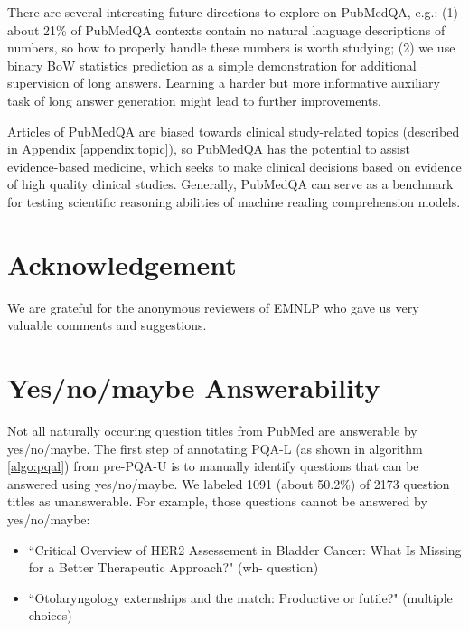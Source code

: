 \documentclass[11pt,a4paper]{article}
\begin{document}
There are several interesting future directions to explore on PubMedQA, e.g.: (1) about 21\% of PubMedQA contexts contain no natural language descriptions of numbers, so how to properly handle these numbers is worth studying; (2)  we use binary BoW statistics prediction as a simple demonstration for additional supervision of long answers. Learning a harder but more informative auxiliary task of long answer generation might lead to further improvements.

Articles of PubMedQA are biased towards clinical study-related topics (described in Appendix \ref{appendix:topic}), so PubMedQA has the potential to assist evidence-based medicine, which seeks to make clinical decisions based on evidence of high quality clinical studies. Generally, PubMedQA can serve as a benchmark for testing scientific reasoning abilities of machine reading comprehension models.

\section{Acknowledgement}
We are grateful for the anonymous reviewers of EMNLP who gave us very valuable comments and suggestions.




\clearpage
\appendix

\section{Yes/no/maybe Answerability}
Not all naturally occuring question titles from PubMed are answerable by yes/no/maybe. The first step of annotating PQA-L (as shown in algorithm \ref{algo:pqal}) from pre-PQA-U is to manually identify questions that can be answered using yes/no/maybe. We labeled 1091 (about 50.2\%) of 2173 question titles as unanswerable. For example, those questions cannot be answered by yes/no/maybe:
\begin{itemize}
    \item ``Critical Overview of HER2 Assessement in Bladder Cancer: What Is Missing for a Better Therapeutic Approach?" (wh- question)
    \item ``Otolaryngology externships and the match: Productive or futile?" (multiple choices)
\end{itemize}
\end{document}
